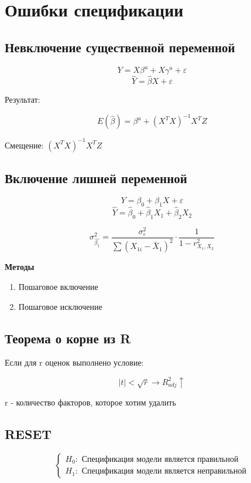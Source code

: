 \documentclass[a4paper, 12pt]{article}
\begin{document}
\section{Ошибки спецификации}

\subsection{Невключение существенной переменной}

\[Y = X\beta^u + X\gamma^u + \varepsilon\]
\[\hat{Y} = \hat{\beta}X + \varepsilon\]

Результат:

\[E(\hat{\beta}) = \beta^u + (X^TX)^{-1}X^TZ\]

Смещение: $(X^TX)^{-1}X^TZ$

\subsection{Включение лишней переменной}


\[Y = \beta_0 + \beta_1 X + \varepsilon\]
\[\hat{Y} = \hat{\beta}_0 + \hat{\beta}_1 X_1 + \hat{\beta}_2 X_2\]

\[\sigma_{\hat{\beta_1}}^2 = \frac{\sigma_{\varepsilon}^2}{\sum (X_{1i} - \bar{X}_1)^2} 
\cdot \frac{1}{1 - r^2_{X_1, X_2}}\]

\textbf{Методы}
\begin{enumerate}
    \item Пошаговое включение
    \item Пошаговое исключение
\end{enumerate}

\subsection{Теорема о корне из R}

Если для r оценок выполнено условие:

\[|t| < \sqrt{r} \rightarrow R^2_{adj} \uparrow\]

r - количество факторов, которое хотим удалить

\subsection{RESET}

\[
\begin{cases}
    H_0: \textrm{ Спецификация модели является правильной} \\
    H_1: \textrm{ Спецификация модели является неправильной}
\end{cases}    
\]
\end{document}
